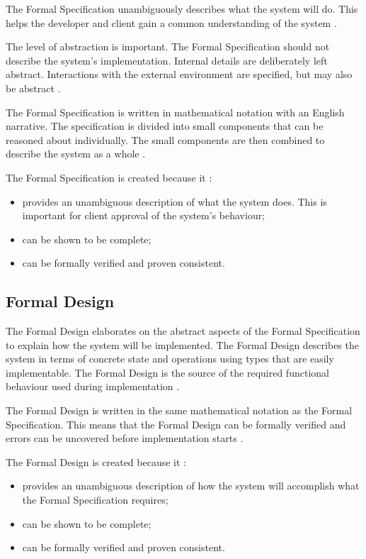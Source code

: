 The Formal Specification unambiguously describes what the system
will do. This helps the developer and client gain a common understanding
of the system \parencite{Tokeneer}.

The level of abstraction is important. The Formal Specification should not describe 
the system's implementation. Internal details are deliberately left abstract. 
Interactions with the external environment are specified, but may also be abstract \parencite{Tokeneer}.

The Formal Specification is written in mathematical notation with an English 
narrative. The specification is divided into small components that can be reasoned
about individually. The small components are then combined to describe the system
as a whole \parencite{Tokeneer}.

The Formal Specification is created because it \parencite{Tokeneer}:
\begin{itemize}
	\item provides an unambiguous description of what the system does. This is
		important for client approval of the system's behaviour;
	\item can be shown to be complete;
	\item can be formally verified and proven consistent.
\end{itemize}

\subsection{Formal Design}

The Formal Design elaborates on the abstract aspects of the Formal 
Specification to explain how the system will be implemented. The Formal Design 
describes the system in terms of concrete state and operations using types that
are easily implementable. The Formal Design is the source of the required functional
behaviour used during implementation  \parencite{Tokeneer}.

The Formal Design is written in the same mathematical notation as the Formal Specification.
This means that the Formal Design can be formally verified and errors can be uncovered
before implementation starts \parencite{Tokeneer}.

The Formal Design is created because it \parencite{Tokeneer}:
\begin{itemize}
	\item provides an unambiguous description of how the system will accomplish what the Formal Specification requires;
	\item can be shown to be complete;
	\item can be formally verified and proven consistent.
\end{itemize}

